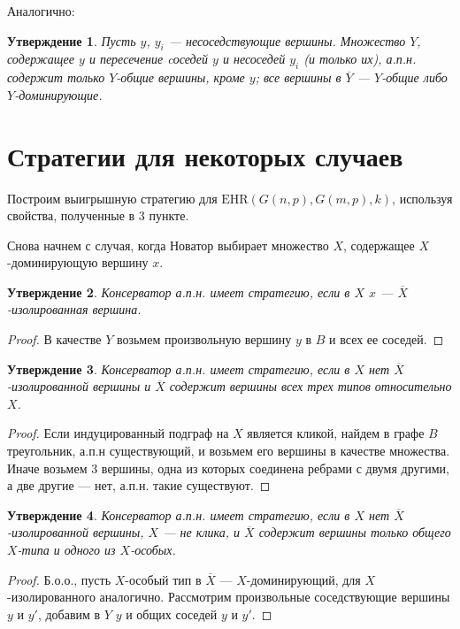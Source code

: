 \documentclass{article}
\newtheorem*{sttm}{Утверждение}
\begin{document}
	Аналогично:
	\begin{sttm}
		Пусть $y$, $y_i$ --- несоседствующие вершины. Множество $Y$, содержащее $y$ и пересечение cоседей $y$ и несоседей $y_i$ (и только их), а.п.н. содержит только $Y$-общие вершины, кроме $y$; все вершины в $\overline{Y}$ --- $Y$-общие либо $Y$-доминирующие.
	\end{sttm}
	
	\section{Стратегии для некоторых случаев}
	
	Построим выигрышную стратегию для $\textrm{EHR}(G(n, p), G(m, p), k)$, используя свойства, полученные в 3 пункте.

	Снова начнем с случая, когда Новатор выбирает множество $X$, содержащее $X$-доминирующую вершину $x$.
	
	\begin{sttm}
		Консерватор а.п.н. имеет стратегию, если в $X$ $x$ --- $\overline{X}$-изолированная вершина.
	\end{sttm}
	
	\begin{proof}
		В качестве $Y$ возьмем произвольную вершину $y$ в $B$ и всех ее соседей. 
	\end{proof}
	
	\begin{sttm}
		Консерватор а.п.н. имеет стратегию, если в $X$ нет $\overline{X}$-изолированной вершины и $\overline{X}$ содержит вершины всех трех типов относительно $X$.
	\end{sttm}
	
	\begin{proof}
		Если индуцированный подграф на $X$ является кликой, найдем в графе $B$  треугольник, а.п.н существующий, и возьмем его вершины в качестве множества. Иначе возьмем 3 вершины, одна из которых соединена ребрами с двумя другими, а две другие --- нет, а.п.н. такие существуют.
	\end{proof}
	
	\begin{sttm}
		Консерватор а.п.н. имеет стратегию, если в $X$ нет $\overline{X}$-изолированной вершины, $X$ --- не клика, и $\overline{X}$ содержит вершины только общего $X$-типа и одного из $X$-особых.
	\end{sttm}
	
	\begin{proof}
		Б.о.о., пусть $X$-особый тип в $\overline{X}$ --- $X$-доминирующий, для $X$-изолированного аналогично. Рассмотрим произвольные соседствующие вершины $y$ и $y'$, добавим в $Y$ $y$ и общих соседей $y$ и $y'$.
	\end{proof}
	
\end{document}
